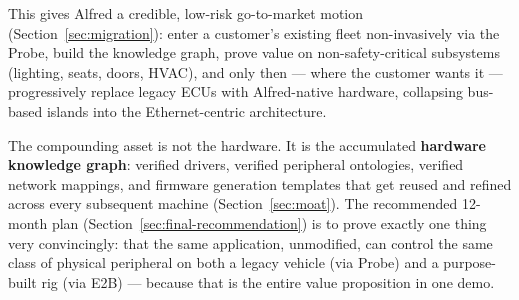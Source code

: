 This gives Alfred a credible, low-risk go-to-market motion (Section~\ref{sec:migration}): enter a customer's existing fleet non-invasively via the Probe, build the knowledge graph, prove value on non-safety-critical subsystems (lighting, seats, doors, HVAC), and only then --- where the customer wants it --- progressively replace legacy ECUs with Alfred-native hardware, collapsing bus-based islands into the Ethernet-centric architecture.

The compounding asset is not the hardware. It is the accumulated \textbf{hardware knowledge graph}: verified drivers, verified peripheral ontologies, verified network mappings, and firmware generation templates that get reused and refined across every subsequent machine (Section~\ref{sec:moat}). The recommended 12-month plan (Section~\ref{sec:final-recommendation}) is to prove exactly one thing very convincingly: that the same application, unmodified, can control the same class of physical peripheral on both a legacy vehicle (via Probe) and a purpose-built rig (via E2B) --- because that is the entire value proposition in one demo.
